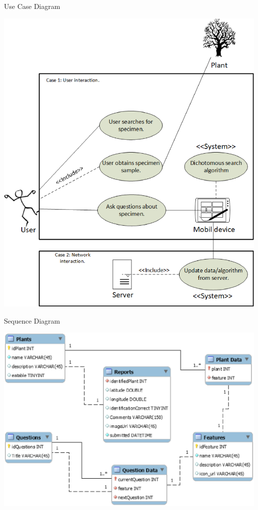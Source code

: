 \documentclass{beamer}
\begin{document}
\begin{frame}{Use Case Diagram}
\begin{center}\includegraphics[scale=.35]{search.eps}\end{center}
\end{frame}
\begin{frame}{Sequence Diagram}
\begin{center}\includegraphics[scale=.5]{DatabaseDesign.eps}\end{center}
\end{frame}
\end{document}
